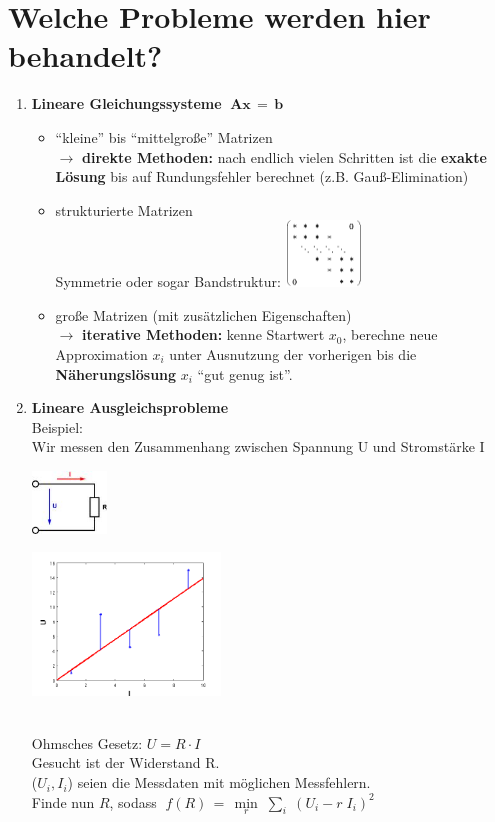 \documentclass[ngerman,fontsize=11pt, paper=a4, parskip=half, titlepage=true, toc=bib]{scrbook}
\begin{document}
  	\section*{Welche Probleme werden hier behandelt?}
  	\begin{enumerate}
  		\item \textbf{Lineare Gleichungssysteme} $\; \boldsymbol A \boldsymbol x \, = \, \boldsymbol b$ 
  		\begin{itemize}
  			\item \enquote{kleine} bis \enquote{mittelgroße} Matrizen\\
  			$\rightarrow$ \textbf{direkte Methoden:} nach endlich vielen
  			Schritten ist die \textbf{exakte Lösung} bis auf
  			Rundungsfehler berechnet (z.B. Gauß-Elimination)
  			\item strukturierte Matrizen \\
  			Symmetrie oder sogar Bandstruktur: \hspace*{1cm}  
  			\includegraphics[width=2cm]{images/band.jpg}
  			
  			\item große Matrizen (mit zusätzlichen Eigenschaften)\\
  			$\rightarrow$ \textbf{iterative Methoden:} kenne Startwert
  			$x_0$, berechne neue Approximation $x_i$ unter
  			Ausnutzung der vorherigen bis die
  			\textbf{Näherungslösung} $x_i$ \enquote{gut genug ist}.
  			\end{itemize}
  			
  			\item \textbf{Lineare Ausgleichsprobleme}\\
  			Beispiel:\\
  			Wir messen den Zusammenhang zwischen Spannung U und
  			Stromstärke I\\
  		\parbox[c]{3cm}{\includegraphics[width=2cm]{images/ohmsche.jpeg} }
  		  \parbox[c]{6cm}{\includegraphics[width=5cm]{images/linausgl2.png}} \\
  				Ohmsches Gesetz: $U = R \cdot I$\\
  				Gesucht ist der Widerstand R. \\
  				($U_i, I_i$) seien die Messdaten mit möglichen Messfehlern.\\
  				Finde nun $R$, sodass 
  				$\; f(R)\, =\,  \min\limits_r \; \sum\limits_i \; (U_i - r \; I_i)^2$
  				

\end{enumerate}
\end{document}
